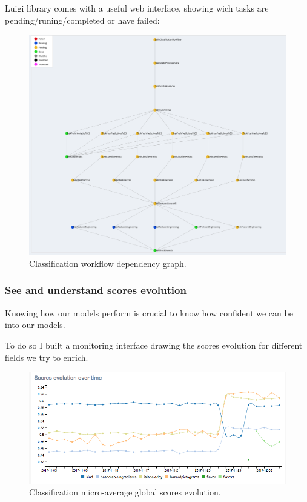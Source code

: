 Luigi library comes with a useful web interface, showing wich tasks are pending/runing/completed or have failed:
\begin{figure}[H]
\centering
\includegraphics[scale=0.50]{./images/monitoring/luigi-graph-3.png}
\caption{Classification workflow dependency graph.}
\end{figure}

\subsubsection{See and understand scores evolution}
Knowing how our models perform is crucial to know how confident we can be into our models.

To do so I built a monitoring interface drawing the scores evolution for different fields we try to enrich.
\begin{figure}[H]
\centering
\includegraphics[scale=0.50]{./images/monitoring/global-scores-evolution-2.png}
\caption{Classification micro-average global scores evolution.}
\end{figure}

